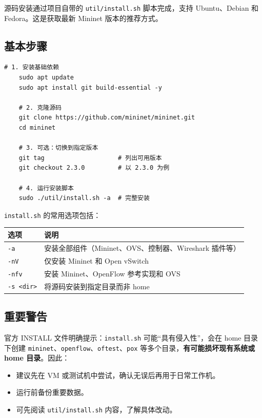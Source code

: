 \documentclass[12pt,a4paper,openany]{ctexbook}
\begin{document}
源码安装通过项目自带的 \texttt{util/install.sh} 脚本完成，支持 Ubuntu、Debian 和 Fedora。这是获取最新 Mininet 版本的推荐方式。

\subsection{基本步骤}

\begin{lstlisting}[style=bashstyle]
	# 1. 安装基础依赖
	sudo apt update
	sudo apt install git build-essential -y
	
	# 2. 克隆源码
	git clone https://github.com/mininet/mininet.git
	cd mininet
	
	# 3. 可选：切换到指定版本
	git tag                    # 列出可用版本
	git checkout 2.3.0         # 以 2.3.0 为例
	
	# 4. 运行安装脚本
	sudo ./util/install.sh -a  # 完整安装
\end{lstlisting}

\texttt{install.sh} 的常用选项包括：

\begin{center}
	\begin{tabular}{@{}ll@{}}
		\toprule
		\textbf{选项} & \textbf{说明} \\
		\midrule
		\texttt{-a} & 安装全部组件（Mininet、OVS、控制器、Wireshark 插件等） \\
		\texttt{-nV} & 仅安装 Mininet 和 Open vSwitch \\
		\texttt{-nfv} & 安装 Mininet、OpenFlow 参考实现和 OVS \\
		\texttt{-s <dir>} & 将源码安装到指定目录而非 home \\
		\bottomrule
	\end{tabular}
\end{center}

\subsection{重要警告}

官方 INSTALL 文件明确提示：\texttt{install.sh} 可能“具有侵入性”，会在 home 目录下创建 \texttt{mininet}、\texttt{openflow}、\texttt{oftest}、\texttt{pox} 等多个目录，\textbf{有可能损坏现有系统或 home 目录}。因此：

\begin{itemize}[leftmargin=*]
	\item 建议先在 VM 或测试机中尝试，确认无误后再用于日常工作机。
	\item 运行前备份重要数据。
	\item 可先阅读 \texttt{util/install.sh} 内容，了解具体改动。
\end{itemize}
\end{document}
